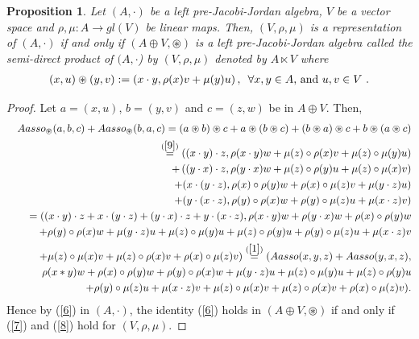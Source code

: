 \documentclass[12pt]{amsart}
\newtheorem{proposition}[Theorem]{Proposition}
\begin{document}
	\begin{proposition}\label{Pro5}
		Let $(A,\cdot)$  be a left pre-Jacobi-Jordan algebra, $V$ be a vector space and $\rho, \mu : A\rightarrow gl(V)$  be linear maps. Then, $(V,\rho,\mu) $ is  a representation of $ (A, \cdot) $ if and only if $ (A\oplus V,\circledast) $ is a left pre-Jacobi-Jordan algebra called the semi-direct product of $(A,\cdot$) by $(V,\rho,\mu)$ denoted by $ A\ltimes V $ where
		\begin{eqnarray}
			\label{9}
			(x,u)\circledast (y,v):=\left( x\cdot y,\rho(x)v+\mu(y)u\right), \mbox{\,\ $\forall  x,y\in A $, and $ u,v\in V $ }.
		\end{eqnarray}
	\end{proposition}
	\begin{proof}
		Let $ a=(x,u) $, $ b=(y,v) $ and $ c=(z,w) $ be in $ A\oplus V $. Then,
		\begin{eqnarray}
			&&Aasso_{\circledast}(a,b,c)+Aasso_{\circledast}(b,a,c)=(a\circledast b)\circledast c+a\circledast(b\circledast c)
			+(b\circledast a)\circledast c+b\circledast(a\circledast c)\nonumber\\
			&&
			\overset{(\ref{9})}{=}((x\cdot y)\cdot z,\rho(x\cdot y)w+\mu(z)\circ\rho(x)v+\mu(z)\circ\mu(y)u)\nonumber\\
			&&+\left( (y\cdot x)\cdot z,\rho(y\cdot x)w
			+\mu(z)\circ\rho(y)u+\mu(z)\circ\mu(x)v\right)\nonumber\\
			&&+(x\cdot (y\cdot z),\rho(x)\circ\rho(y)w+\rho(x)\circ\mu(z)v+\mu(y\cdot z)u)\nonumber\\
			&&+(y\cdot (x\cdot z),\rho(y)\circ\rho(x)w+\rho(y)\circ\mu(z)u+\mu(x\cdot z)v)\nonumber\\
			&&	=((x\cdot y)\cdot z+x\cdot (y\cdot z)+(y\cdot x)\cdot z+y\cdot (x\cdot z),\rho(x\cdot y)w+\rho(y\cdot x)w+\rho(x)\circ\rho(y)w\nonumber\\
			&&
			+\rho(y)\circ\rho(x)w+\mu(y\cdot z)u+\mu(z)\circ\mu(y)u+
			\mu(z)\circ\rho(y)u+\rho(y)\circ\mu(z)u+\mu(x\cdot z)v\nonumber\\
			&&
			+\mu(z)\circ\mu(x)v+\mu(z)\circ\rho(x)v+\rho(x)\circ\mu(z)v)
			\overset{(\ref{1})}{=}(Aasso(x,y,z)+Aasso(y,x,z),\nonumber\\
			&&\rho(x\ast y)w+\rho(x)\circ\rho(y)w+\rho(y)\circ\rho(x)w+\mu(y\cdot z)u
			+\mu(z)\circ\mu(y)u+\mu(z)\circ\rho(y)u\nonumber\\
			&&+\rho(y)\circ\mu(z)u+\mu(x\cdot z)v+\mu(z)\circ\mu(x)v+\mu(z)\circ\rho(x)v+\rho(x)\circ\mu(z)v).\nonumber
		\end{eqnarray} 
		Hence by (\ref{6}) in $(A,\cdot)$, the identity (\ref{6})  holds in $(A\oplus V,\circledast)$ if and only if (\ref{7}) and (\ref{8}) hold for $(V,\rho,\mu).$
	\end{proof}
\end{document}
